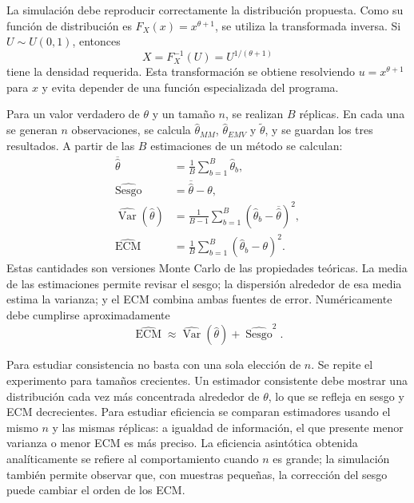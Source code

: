 \documentclass[10pt,a4paper,oneside]{article}
\newcommand{\Var}{\operatorname{Var}}
\begin{document}
La simulación debe reproducir correctamente la distribución propuesta. Como su función de distribución es $F_X(x)=x^{\theta+1}$, se utiliza la transformada inversa. Si $U\sim U(0,1)$, entonces
\begin{equation*}
X=F_X^{-1}(U)=U^{1/(\theta+1)}
\end{equation*}
tiene la densidad requerida. Esta transformación se obtiene resolviendo $u=x^{\theta+1}$ para $x$ y evita depender de una función especializada del programa.

Para un valor verdadero de $\theta$ y un tamaño $n$, se realizan $B$ réplicas. En cada una se generan $n$ observaciones, se calcula $\widehat\theta_{MM}$, $\widehat\theta_{EMV}$ y $\widetilde\theta$, y se guardan los tres resultados. A partir de las $B$ estimaciones de un método se calculan:
\begin{align*}
\overline{\widehat\theta}
&=\frac1B\sum_{b=1}^{B}\widehat\theta_b,\\
\widehat{\operatorname{Sesgo}}
&=\overline{\widehat\theta}-\theta,\\
\widehat{\Var}(\widehat\theta)
&=\frac{1}{B-1}\sum_{b=1}^{B}
(\widehat\theta_b-\overline{\widehat\theta})^2,\\
\widehat{\operatorname{ECM}}
&=\frac1B\sum_{b=1}^{B}(\widehat\theta_b-\theta)^2.
\end{align*}
Estas cantidades son versiones Monte Carlo de las propiedades teóricas. La media de las estimaciones permite revisar el sesgo; la dispersión alrededor de esa media estima la varianza; y el ECM combina ambas fuentes de error. Numéricamente debe cumplirse aproximadamente
\begin{equation*}
\widehat{\operatorname{ECM}}
\approx
\widehat{\Var}(\widehat\theta)
+\widehat{\operatorname{Sesgo}}^{2}.
\end{equation*}

Para estudiar consistencia no basta con una sola elección de $n$. Se repite el experimento para tamaños crecientes. Un estimador consistente debe mostrar una distribución cada vez más concentrada alrededor de $\theta$, lo que se refleja en sesgo y ECM decrecientes. Para estudiar eficiencia se comparan estimadores usando el mismo $n$ y las mismas réplicas: a igualdad de información, el que presente menor varianza o menor ECM es más preciso. La eficiencia asintótica obtenida analíticamente se refiere al comportamiento cuando $n$ es grande; la simulación también permite observar que, con muestras pequeñas, la corrección del sesgo puede cambiar el orden de los ECM.
\end{document}
